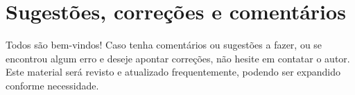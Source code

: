 \documentclass[a4paper,12pt]{article}
\begin{document}
\section*{Sugestões, correções e comentários}

Todos são bem-vindos! Caso tenha comentários ou sugestões a fazer, ou se encontrou algum erro e deseje apontar correções, não hesite em contatar o autor. Este material será revisto e atualizado frequentemente, podendo ser expandido conforme necessidade. 
\end{document}
